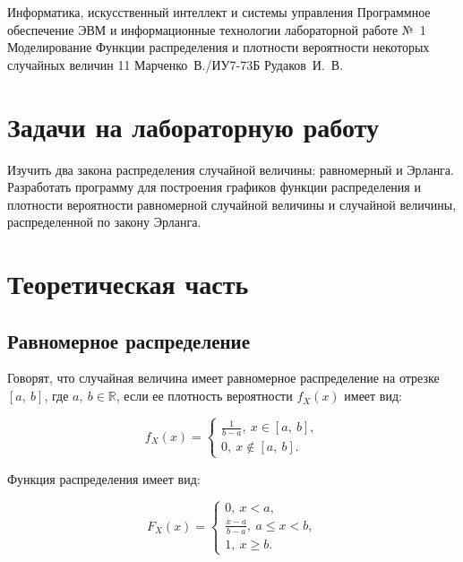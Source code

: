 \documentclass{bmstu}
\begin{document}
\makereporttitle
    {Информатика, искусственный интеллект и системы управления} %
    {Программное обеспечение ЭВМ и информационные технологии} %
    {лабораторной работе №~1} %
    {Моделирование} %
    {Функции распределения и плотности вероятности некоторых случайных величин} %
    {11} %
    {Марченко~В./ИУ7-73Б} %
    {Рудаков~И.~В.} %

{\centering \maketableofcontents}

\chapter{Задачи на лабораторную работу}

Изучить два закона распределения случайной величины: равномерный и Эрланга. 
Разработать программу для построения графиков функции распределения и плотности вероятности равномерной случайной величины и случайной величины, распределенной по закону Эрланга.

\chapter{Теоретическая часть}

\section{Равномерное распределение}

Говорят, что случайная величина имеет равномерное распределение на отрезке $[a,~b]$, где $a,~b \in \mathbb{R}$, если ее плотность вероятности $f_{X}(x)$ имеет вид:

\begin{equation}
f_{X}(x) = \begin{cases}
	\frac{1}{b - a},~x \in [a,~b], \\
	0,~x \notin [a,~b].
	\end{cases}
\end{equation}

Функция распределения имеет вид:

\begin{equation}
F_{X}(x) = \begin{cases}
	0,~x < a, \\
	\frac{x - a}{b - a},~a \leq x < b, \\
	1,~x \geq b.
	\end{cases}
\end{equation}
\end{document}
